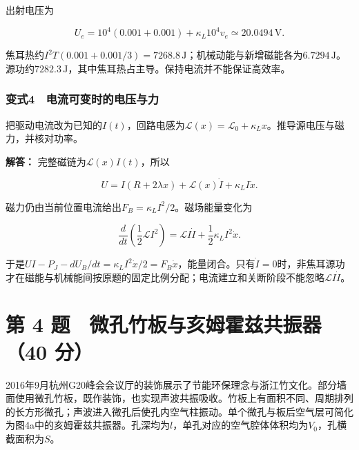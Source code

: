 \documentclass[12pt,a4paper,fontset=fandol]{ctexart}
\begin{document}
出射电压为

\[
U_e=10^4(0.001+0.001)
+\kappa_L10^4v_e
\simeq20.0494\,\mathrm V.
\]

焦耳热约\(I^2T(0.001+0.001/3)=7268.8\,\mathrm J\)；机械动能与新增磁能各为\(6.7294\,\mathrm J\)。源功约\(7282.3\,\mathrm J\)，其中焦耳热占主导。保持电流并不能保证高效率。

\par\noindent\begin{minipage}{\linewidth}
\subsubsection{变式4　电流可变时的电压与力}\label{ux53d8ux5f0f4-ux7535ux6d41ux53efux53d8ux65f6ux7684ux7535ux538bux4e0eux529b}

把驱动电流改为已知的\(I(t)\)，回路电感为\(\mathcal L(x)=\mathcal L_0+\kappa_Lx\)。推导源电压与磁力，并核对功率。

\textbf{解答：} 完整磁链为\(\mathcal L(x)I(t)\)，所以

\[
\boxed{
U=I(R+2\lambda x)+\mathcal L(x)\dot I
+\kappa_LI\dot x}.
\]

磁力仍由当前位置电流给出\(F_B=\kappa_LI^2/2\)。磁场能量变化为

\[
\frac{d}{dt}\left(\frac12\mathcal L I^2\right)
=\mathcal L I\dot I+\frac12\kappa_LI^2\dot x.
\]

于是\(UI-P_J-dU_B/dt=\kappa_LI^2\dot x/2=F_B\dot x\)，能量闭合。只有\(\dot I=0\)时，非焦耳源功才在磁能与机械能间按原题的固定比例分配；电流建立和关断阶段不能忽略\(\mathcal L I\dot I\)。

\end{minipage}\par
\clearpage

\section{第 4 题　微孔竹板与亥姆霍兹共振器（40
分）}\label{ux7b2c-4-ux9898-ux5faeux5b54ux7af9ux677fux4e0eux4ea5ux59c6ux970dux5179ux5171ux632fux566840-ux5206}

2016年9月杭州G20峰会会议厅的装饰展示了节能环保理念与浙江竹文化。部分墙面使用微孔竹板，既作装饰，也实现声波共振吸收。竹板上有面积不同、周期排列的长方形微孔；声波进入微孔后使孔内空气柱振动。单个微孔与板后空气层可简化为图4a中的亥姆霍兹共振器。孔深均为\(l\)，单孔对应的空气腔体体积均为\(V_0\)，孔横截面积为\(S\)。
\end{document}
